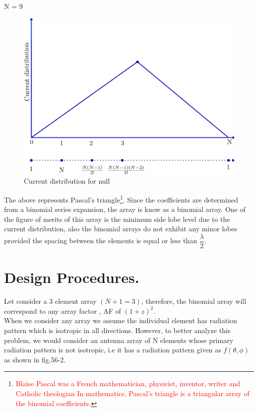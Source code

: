 N = 9\; \;   \;  \; \;  \; \;  \; \;\; \; \;  \; \;  \; \;  \; \; \\

\begin{figure}[h]
\centering
\includegraphics[width=1\linewidth]{"./graphics/img59_2"}
\caption{Current distribution for null}
\label{fig:fig-1}
\end{figure}
The above represents Pascal's triangle\footnote{\textcolor{red}{Blaise Pascal was a French mathematician, physicist, inventor, writer and Catholic theologian In mathematics, Pascal's triangle is a triangular array of the binomial coefficients.}}. Since the coefficients are determined from a binomial series expansion, the array is know as a binomial array. One of the figure of merits of this array is the minimum side lobe level due to the current distribution, also the binomial arrays do not exhibit any minor lobes provided the spacing between the elements is equal or less than $\dfrac{\lambda}{2}$.\\

\section{Design Procedures.}
Let consider a 3 element array $(N + 1 = 3)$, therefore, the binomial array will correspond to any array factor , AF of $(1 + z)^2$.\\
When we consider any array we assume the individual element has radiation pattern which is isotropic in all directions. However, to better analyze this problem, we would consider an antenna array of N elements whose primary radiation pattern is not isotropic, i.e it has a radiation pattern given as $f(\theta,\phi)$ as shown in fig.56-2.

